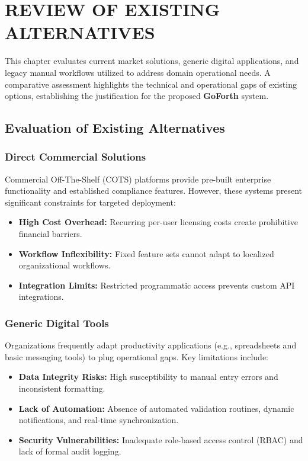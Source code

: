 \chapter{REVIEW OF EXISTING ALTERNATIVES}
\label{chap:review-of-alternatives}

This chapter evaluates current market solutions, generic digital applications, and legacy manual workflows utilized to address domain operational needs. A comparative assessment highlights the technical and operational gaps of existing options, establishing the justification for the proposed \textbf{GoForth} system.

\section{Evaluation of Existing Alternatives}

\subsection{Direct Commercial Solutions}
Commercial Off-The-Shelf (COTS) platforms provide pre-built enterprise functionality and established compliance features. However, these systems present significant constraints for targeted deployment:
\begin{itemize}
    \item \textbf{High Cost Overhead:} Recurring per-user licensing costs create prohibitive financial barriers.
    \item \textbf{Workflow Inflexibility:} Fixed feature sets cannot adapt to localized organizational workflows.
    \item \textbf{Integration Limits:} Restricted programmatic access prevents custom API integrations.
\end{itemize}

\subsection{Generic Digital Tools}
Organizations frequently adapt productivity applications (e.g., spreadsheets and basic messaging tools) to plug operational gaps. Key limitations include:
\begin{itemize}
    \item \textbf{Data Integrity Risks:} High susceptibility to manual entry errors and inconsistent formatting.
    \item \textbf{Lack of Automation:} Absence of automated validation routines, dynamic notifications, and real-time synchronization.
    \item \textbf{Security Vulnerabilities:} Inadequate role-based access control (RBAC) and lack of formal audit logging.
\end{itemize}

